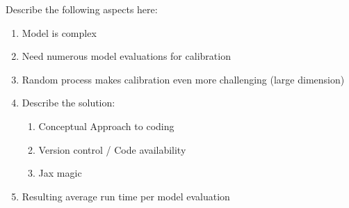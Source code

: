 Describe the following aspects here:
\begin{enumerate}
    \item Model is complex
    \item Need numerous model evaluations for calibration
    \item Random process makes calibration even more challenging (large dimension)
    \item Describe the solution:
    \begin{enumerate}
        \item Conceptual Approach to coding
        \item Version control / Code availability
        \item Jax magic
    \end{enumerate}
    \item Resulting average run time per model evaluation
\end{enumerate}
